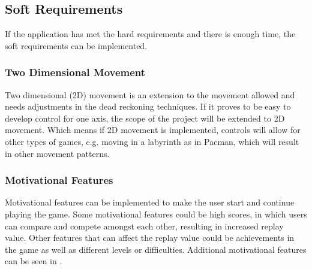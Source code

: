 \subsection{Soft Requirements}
If the application has met the hard requirements and there is enough time, the soft requirements can be implemented.

\subsubsection*{Two Dimensional Movement} 
Two dimensional (2D) movement is an extension to the movement allowed and needs adjustments in the dead reckoning techniques.
If it proves to be easy to develop control for one axis, the scope of the project will be extended to 2D movement. 
Which means if 2D movement is implemented, controls will allow for other types of games, e.g. moving in a labyrinth as in Pacman, which will result in other movement patterns.

\subsubsection*{Motivational Features}
Motivational features can be implemented to make the user start and continue playing the game.
Some motivational features could be high scores, in which users can compare and compete amongst each other, resulting in increased replay value.  
Other features that can affect the replay value could be achievements in the game as well as different levels or difficulties.
Additional motivational features can be seen in .